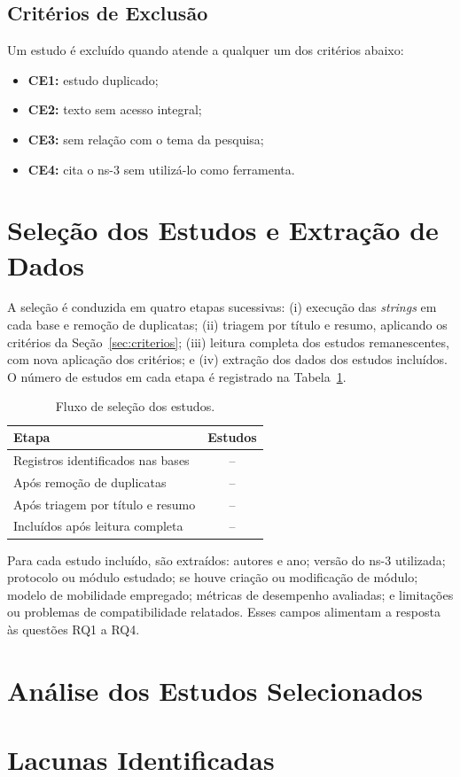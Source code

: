 \subsection{Critérios de Exclusão}
\label{sec:exclusao}

Um estudo é excluído quando atende a qualquer um dos critérios abaixo:

\begin{itemize}
  \item \textbf{CE1:} estudo duplicado;
  \item \textbf{CE2:} texto sem acesso integral;
  \item \textbf{CE3:} sem relação com o tema da pesquisa;
  \item \textbf{CE4:} cita o ns-3 sem utilizá-lo como ferramenta.
\end{itemize}

\section{Seleção dos Estudos e Extração de Dados}
\label{sec:selecao}

A seleção é conduzida em quatro etapas sucessivas: (i) execução das \textit{strings} em cada
base e remoção de duplicatas; (ii) triagem por título e resumo, aplicando os critérios da
Seção~\ref{sec:criterios}; (iii) leitura completa dos estudos remanescentes, com nova
aplicação dos critérios; e (iv) extração dos dados dos estudos incluídos. O número de
estudos em cada etapa é registrado na Tabela~\ref{tab:fluxo}.

\begin{table}[ht]
\centering
\caption{Fluxo de seleção dos estudos.}
\label{tab:fluxo}
\small
\begin{tabular}{|l|c|}
\hline
\textbf{Etapa} & \textbf{Estudos} \\ \hline
Registros identificados nas bases & -- \\ \hline
Após remoção de duplicatas & -- \\ \hline
Após triagem por título e resumo & -- \\ \hline
Incluídos após leitura completa & -- \\ \hline
\end{tabular}

\par\vspace{0.1cm}{\small Fonte: elaborado pelo autor.}
\end{table}

Para cada estudo incluído, são extraídos: autores e ano; versão do ns-3 utilizada; protocolo ou
módulo estudado; se houve criação ou modificação de módulo; modelo de mobilidade
empregado; métricas de desempenho avaliadas; e limitações ou problemas de compatibilidade
relatados. Esses campos alimentam a resposta às questões RQ1 a RQ4.

\section{Análise dos Estudos Selecionados}
\label{sec:analise-rsl}


\section{Lacunas Identificadas}
\label{sec:lacunas}


